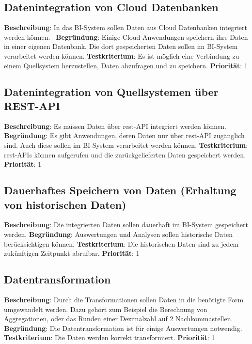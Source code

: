 \subsection{Datenintegration von Cloud Datenbanken} \label{sec:anforderungsspezifikation:datenintegrationCloudDB}
\textbf{Beschreibung}: In das BI-System sollen Daten aus Cloud Datenbanken integriert werden können.  
\newline \textbf{Begründung}: Einige Cloud Anwendungen speichern ihre Daten in einer eigenen Datenbank. Die dort gespeicherten Daten sollen im BI-System verarbeitet werden können.
\newline \textbf{Testkriterium}: Es ist möglich eine Verbindung zu einem Quellsystem herzustellen, Daten abzufragen und zu speichern.
\newline \textbf{Priorität}: 1

\subsection{Datenintegration von Quellsystemen über REST-API} \label{sec:anforderungsspezifikation:datenintegrationREST}
\textbf{Beschreibung}: Es müssen Daten über \ac{rest}-API integriert werden können. 
\newline \textbf{Begründung}: Es gibt Anwendungen, deren Daten nur über \ac{rest}-API zugänglich sind. Auch diese sollen im BI-System verarbeitet werden können.
\newline \textbf{Testkriterium}: \ac{rest}-APIs können aufgerufen und die zurückgelieferten Daten gespeichert werden.
\newline \textbf{Priorität}: 1

\subsection[Langfristige Datenspeicherung]{Dauerhaftes Speichern von Daten (Erhaltung von historischen Daten)} \label{sec:anforderungsspezifikation:dauerhaftesSpeichern}
\textbf{Beschreibung}: Die integrierten Daten sollen dauerhaft im BI-System gespeichert werden.
\newline \textbf{Begründung}: Auswertungen und Analysen sollen historische Daten berücksichtigen können.
\newline \textbf{Testkriterium}: Die historischen Daten sind zu jedem zukünftigen Zeitpunkt abrufbar.
\newline \textbf{Priorität}: 1

\subsection{Datentransformation} \label{sec:anforderungsspezifikation:datentransformation}
\textbf{Beschreibung}: Durch die Transformationen sollen Daten in die benötigte Form umgewandelt werden. Dazu gehört zum Beispiel die Berechnung von Aggregationen, oder das Runden einer Dezimalzahl auf 2 Nachkommastellen.
\newline \textbf{Begründung}: Die Datentransformation ist für einige Auswertungen notwendig.
\newline \textbf{Testkriterium}: Die Daten werden korrekt transformiert.
\newline \textbf{Priorität}: 1

